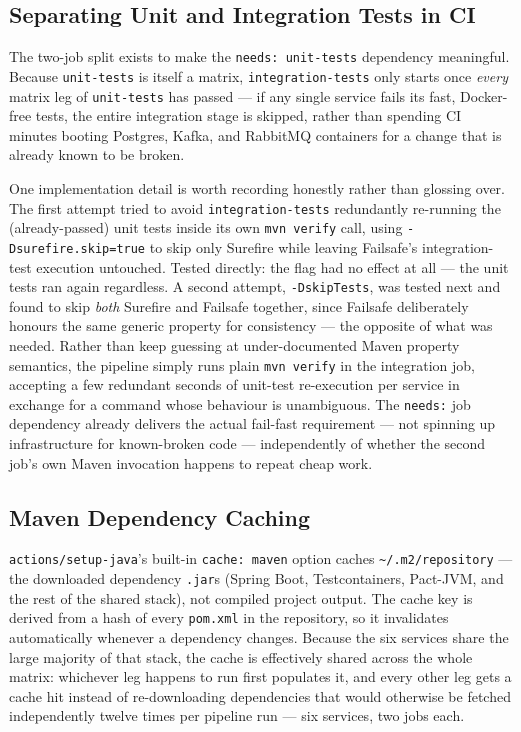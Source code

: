 \subsection{Separating Unit and Integration Tests in CI}

The two-job split exists to make the \texttt{needs: unit-tests} dependency meaningful. Because \texttt{unit-tests} is itself a matrix, \texttt{integration-tests} only starts once \emph{every} matrix leg of \texttt{unit-tests} has passed --- if any single service fails its fast, Docker-free tests, the entire integration stage is skipped, rather than spending CI minutes booting Postgres, Kafka, and RabbitMQ containers for a change that is already known to be broken.

One implementation detail is worth recording honestly rather than glossing over. The first attempt tried to avoid \texttt{integration-tests} redundantly re-running the (already-passed) unit tests inside its own \texttt{mvn verify} call, using \texttt{-Dsurefire.skip=true} to skip only Surefire while leaving Failsafe's integration-test execution untouched. Tested directly: the flag had no effect at all --- the unit tests ran again regardless. A second attempt, \texttt{-DskipTests}, was tested next and found to skip \emph{both} Surefire and Failsafe together, since Failsafe deliberately honours the same generic property for consistency --- the opposite of what was needed. Rather than keep guessing at under-documented Maven property semantics, the pipeline simply runs plain \texttt{mvn verify} in the integration job, accepting a few redundant seconds of unit-test re-execution per service in exchange for a command whose behaviour is unambiguous. The \texttt{needs:} job dependency already delivers the actual fail-fast requirement --- not spinning up infrastructure for known-broken code --- independently of whether the second job's own Maven invocation happens to repeat cheap work.

\subsection{Maven Dependency Caching}

\texttt{actions/setup-java}'s built-in \texttt{cache: maven} option caches \texttt{\textasciitilde/.m2/repository} --- the downloaded dependency \texttt{.jar}s (Spring Boot, Testcontainers, Pact-JVM, and the rest of the shared stack), not compiled project output. The cache key is derived from a hash of every \texttt{pom.xml} in the repository, so it invalidates automatically whenever a dependency changes. Because the six services share the large majority of that stack, the cache is effectively shared across the whole matrix: whichever leg happens to run first populates it, and every other leg gets a cache hit instead of re-downloading dependencies that would otherwise be fetched independently twelve times per pipeline run --- six services, two jobs each.

